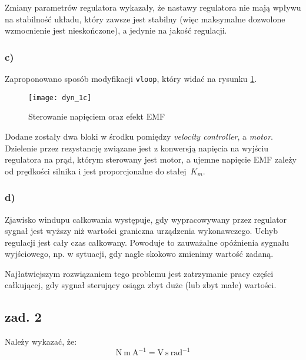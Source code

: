 \documentclass[11pt, a4paper]{article}
\begin{document}
Zmiany parametrów regulatora wykazały, że nastawy regulatora nie mają wpływu na stabilność układu, który zawsze jest stabilny (więc maksymalne dozwolone wzmocnienie jest nieskończone), a jedynie na jakość regulacji.

\subsubsection*{c)}

Zaproponowano sposób modyfikacji \texttt{vloop}, który widać na rysunku \ref{fig:dyn_1c}.
\begin{figure}[htbp!]
	\centering
	\texttt{[image: dyn\_1c]}
	\caption{Sterowanie napięciem oraz efekt EMF \label{fig:dyn_1c}}
\end{figure}

Dodane zostały dwa bloki w środku pomiędzy \emph{velocity controller}, a \emph{motor}. Dzielenie przez rezystancję związane jest z konwersją napięcia na wyjściu regulatora na prąd, którym sterowany jest motor, a ujemne napięcie EMF zależy od prędkości silnika i jest proporcjonalne do stałej~$K_m$.

\subsubsection*{d)}

Zjawisko windupu całkowania występuje, gdy wypracowywany przez regulator sygnał jest wyższy niż wartości graniczna urządzenia wykonawczego. Uchyb regulacji jest cały czas całkowany. Powoduje to zauważalne opóźnienia sygnału wyjściowego, np. w sytuacji, gdy nagle skokowo zmienimy wartość zadaną.

Najłatwiejszym rozwiązaniem tego problemu jest zatrzymanie pracy części całkującej, gdy sygnał sterujący osiąga zbyt duże (lub zbyt małe) wartości.


\subsection*{zad. 2}

Należy wykazać, że:
\begin{equation*}
\text{N} \ \text{m} \ \text{A}^{-1} = \text{V} \ \text{s} \ \text{rad}^{-1}
\end{equation*}
\end{document}
